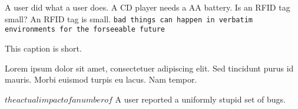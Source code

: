 \begin{comment}
some bad stuff that is in the comment environment and should be ignored.
we we
behavior
fashion
\end{comment}
A user did what a user does.  %
A CD player needs a AA battery.  %
Is an RFID tag small?
An RFID tag is small.
\verb+bad things can happen in verbatim environments for the forseeable future+
\caption{This caption is short.}
\caption[Lorem ipsum.]{Lorem ipsum dolor sit amet, consectetuer adipiscing elit. Sed tincidunt purus id mauris. Morbi euismod turpis eu lacus. Nam tempor.}
$the actual impact of a number of$ %
A user reported a uniformly stupid set of bugs.
